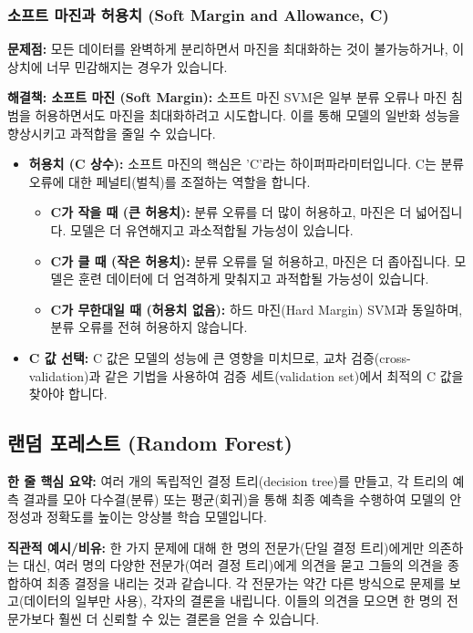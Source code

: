 \documentclass[11pt,a4paper]{article}
\begin{document}
\subsubsection*{소프트 마진과 허용치 (Soft Margin and Allowance, C)}

\textbf{문제점:} 모든 데이터를 완벽하게 분리하면서 마진을 최대화하는 것이 불가능하거나, 이상치에 너무 민감해지는 경우가 있습니다.

\textbf{해결책: 소프트 마진 (Soft Margin):}
소프트 마진 SVM은 일부 분류 오류나 마진 침범을 허용하면서도 마진을 최대화하려고 시도합니다. 이를 통해 모델의 일반화 성능을 향상시키고 과적합을 줄일 수 있습니다.

\begin{itemize}
    \item \textbf{허용치 (C 상수):} 소프트 마진의 핵심은 'C'라는 하이퍼파라미터입니다. C는 분류 오류에 대한 페널티(벌칙)를 조절하는 역할을 합니다.
        \begin{itemize}
            \item \textbf{C가 작을 때 (큰 허용치):} 분류 오류를 더 많이 허용하고, 마진은 더 넓어집니다. 모델은 더 유연해지고 과소적합될 가능성이 있습니다.
            \item \textbf{C가 클 때 (작은 허용치):} 분류 오류를 덜 허용하고, 마진은 더 좁아집니다. 모델은 훈련 데이터에 더 엄격하게 맞춰지고 과적합될 가능성이 있습니다.
            \item \textbf{C가 무한대일 때 (허용치 없음):} 하드 마진(Hard Margin) SVM과 동일하며, 분류 오류를 전혀 허용하지 않습니다.
        \end{itemize}
    \item \textbf{C 값 선택:} C 값은 모델의 성능에 큰 영향을 미치므로, 교차 검증(cross-validation)과 같은 기법을 사용하여 검증 세트(validation set)에서 최적의 C 값을 찾아야 합니다.
\end{itemize}

\newpage
\subsection{랜덤 포레스트 (Random Forest)}

\begin{conceptbox}
\textbf{한 줄 핵심 요약:} 여러 개의 독립적인 결정 트리(decision tree)를 만들고, 각 트리의 예측 결과를 모아 다수결(분류) 또는 평균(회귀)을 통해 최종 예측을 수행하여 모델의 안정성과 정확도를 높이는 앙상블 학습 모델입니다.
\end{conceptbox}

\textbf{직관적 예시/비유:}
한 가지 문제에 대해 한 명의 전문가(단일 결정 트리)에게만 의존하는 대신, 여러 명의 다양한 전문가(여러 결정 트리)에게 의견을 묻고 그들의 의견을 종합하여 최종 결정을 내리는 것과 같습니다. 각 전문가는 약간 다른 방식으로 문제를 보고(데이터의 일부만 사용), 각자의 결론을 내립니다. 이들의 의견을 모으면 한 명의 전문가보다 훨씬 더 신뢰할 수 있는 결론을 얻을 수 있습니다.
\end{document}
